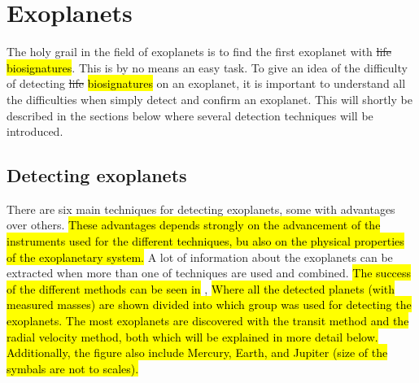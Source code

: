 \section{Exoplanets}
\label{sec:exoplanets}

The holy grail in the field of exoplanets is to find the first exoplanet with \st{life}
\hl{biosignatures}. This is by no means an easy task. To give an idea of the difficulty of detecting
\st{life} \hl{biosignatures} on an exoplanet, it is important to understand all the difficulties
when simply detect and confirm an exoplanet. This will shortly be described in the sections below
where several detection techniques will be introduced.

\subsection{Detecting exoplanets}
\label{sec:detecting_exoplanets}

There are six main techniques for detecting exoplanets, some with advantages over others. \hl{These
advantages depends strongly on the advancement of the instruments used for the different techniques,
bu also on the physical properties of the exoplanetary system.} A lot of information about the
exoplanets can be extracted when more than one of techniques are used and combined. \hl{The success
of the different methods can be seen in} , \hl{Where all the detected
planets (with measured masses) are shown divided into which group was used for detecting the
exoplanets. The most exoplanets are discovered with the transit method and the radial velocity
method, both which will be explained in more detail below. Additionally, the figure also include
Mercury, Earth, and Jupiter (size of the symbals are not to scales).}

